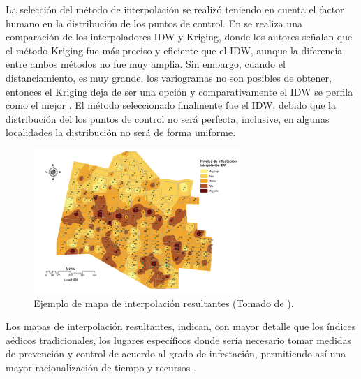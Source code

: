 La selección del método de interpolación se realizó teniendo en cuenta el factor humano en la
distribución de los puntos de control. En \cite{villatoro2007comparacion} se realiza una
comparación de los interpoladores IDW y Kriging, donde los autores señalan que el método Kriging
fue más preciso y eficiente que el IDW, aunque la diferencia entre ambos métodos no fue muy amplia.
Sin embargo, cuando el distanciamiento, es muy grande, los variogramas no son posibles de obtener,
entonces el Kriging deja de ser una opción y comparativamente el IDW se perfila como el mejor
\cite{villatoro2007comparacion}. El método seleccionado finalmente fue el IDW, debido que la
distribución del los puntos de control no será perfecta, inclusive, en algunas localidades la
distribución no será de forma uniforme.

\begin{figure}[!htbp]
\centering
\includegraphics[width=0.7\textwidth]{capitulo-2/graphics/puntos-control-interpolacion.png}
\caption{\label{fig:sig-puntos-control-interpolacion}Ejemplo de mapa de interpolación resultantes (Tomado de \cite{NINO2011}).}
\end{figure}

Los mapas de interpolación resultantes, indican, con mayor detalle que los índices aédicos
tradicionales, los lugares específicos donde sería necesario tomar medidas de prevención y
control de acuerdo al grado de infestación, permitiendo así una mayor racionalización de tiempo y
recursos \cite{NINO2011}.
